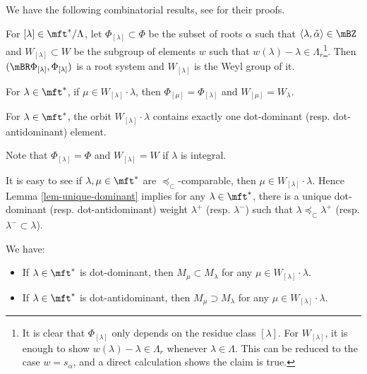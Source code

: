 	We have the following combinatorial results, see \cite[Sect. 3.4-3.5]{H} for their proofs.

	\begin{thm}
		For $[\lambda]\in \mft^*/\Lambda$, let $\Phi_{[\lambda]} \subset \Phi$ be the subset of roots $\alpha$ such that $\langle \lambda,\check \alpha \rangle \in \mBZ$ and $W_{[\lambda]}\subset W$ be the subgroup of elements $w$ such that $w(\lambda) - \lambda \in\Lambda_r$\footnote{It is clear that $\Phi_{[\lambda]}$ only depends on the residue class $[\lambda]$. For $W_{[\lambda]}$, it is enough to show $w(\lambda)-\lambda \in \Lambda_r$ whenever $\lambda\in \Lambda$. This can be reduced to the case $w=s_\alpha$, and a direct calculation shows the claim is true.}. Then $( \mBR\Phi_{[\lambda]}, \Phi_{[\lambda]} )$ is a root system and $W_{[\lambda]}$ is the Weyl group of it.
	\end{thm}

	\begin{lem}
		For $\lambda\in \mft^*$, if $\mu \in W_{[\lambda]}\cdot \lambda$, then $\Phi_{[\mu]}=\Phi_{[\lambda]}$ and $W_{[\mu]}=W_{\lambda}$.
 	\end{lem}


	\begin{lem}
		\label{lem-unique-dominant}
		For $\lambda \in \mft^*$, the orbit $W_{[\lambda]}\cdot \lambda$ contains exactly one dot-dominant (resp. dot-antidominant) element.
 	\end{lem}

 	\begin{rem}
 		Note that $\Phi_{[\lambda]}=\Phi$ and $W_{[\lambda]}= W$ if $\lambda$ is integral.
 	\end{rem}

 	\begin{rem}
 		It is easy to see if $\lambda,\mu \in\mft^*$ are $\preceq_\subset$-comparable, then $\mu \in W_{[\lambda]}\cdot \lambda$. Hence Lemma \ref{lem-unique-dominant} implies for any $\lambda  \in\mft^*$, there is a unique dot-dominant (resp. dot-antidominant) weight $\lambda^+$ (resp. $\lambda^-$) such that $\lambda \preceq_\subset \lambda^+$ (resp. $\lambda^-\subset \lambda$).
 	\end{rem}

 

 	\begin{cor}
 		\label{cor-dominant-contains-other}
 		We have:
 		\begin{itemize}
 			\item[(1)]
 				If $\lambda\in \mft^*$ is dot-dominant, then $M_\mu \subset M_\lambda$ for any $\mu\in W_{[\lambda]}\cdot \lambda$.
 			\item[(2)]
 				If $\lambda\in \mft^*$ is dot-antidominant, then $M_\mu \supset M_\lambda$ for any $\mu\in W_{[\lambda]}\cdot \lambda$.
 		\end{itemize}
 	\end{cor}



